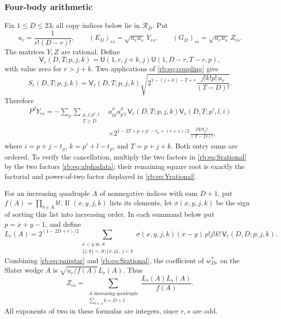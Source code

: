 \subsubsection{Four-body arithmetic}
\label{rb:app:four-arithmetic}
Fix $1\le D\le23$; all copy indices below lie in $\mathcal R_D$. Put
\[
 u_r=\frac1{r!(D-r)!},\qquad
 (E_D)_{rs}=\sqrt{u_ru_s}\,Y_{rs},\qquad
 (G_D)_{rs}=\sqrt{u_ru_s}\,Z_{rs}.
\]
The matrices $Y,Z$ are rational. Define
\[
 \mathsf V_r(D,T;p,j,k)=
 \mathsf U(1,r,j+k,j)\mathsf U(1,D-r,T-r,p),
\]
with value zero for $r>j+k$. Two applications of \eqref{rb:eq:coupling} give
\begin{equation}\label{rb:eq:Srational}
 S_r(D,T;p,j,k)=\mathsf V_r(D,T;p,j,k)
 \sqrt{2^{1-(j+k)-T+r}\frac{j!k!p!\,u_r}{(T-D)!}}.
\end{equation}
Therefore
\begin{equation}\label{rb:eq:Yrational}
 \begin{split}
 P^2Y_{rs}=-\sum_\rho\sum_{\substack{p,j;p',l\\T\ge D}}
 &a^\rho_{pj}a^\rho_{p'l}\,
 \mathsf V_r(D,T;p,j,k)\mathsf V_s(D,T;p',l,i)\\
 &\times2^{1-2T+p+p'-t_\rho+(r+s)/2}
       \frac{i!k!t_\rho!}{(T-D)!},
 \end{split}
\end{equation}
where $i=p+j-t_\rho$, $k=p'+l-t_\rho$, and $T=p+j+k$. Both entry sums are ordered. To verify the cancellation, multiply the two factors in \eqref{rb:eq:Srational} by the two factors \eqref{rb:eq:alphadata}; their remaining square root is exactly the factorial and power-of-two factor displayed in \eqref{rb:eq:Yrational}.

For an increasing quadruple $A$ of nonnegative indices with sum $D+1$, put $f(A)=\prod_{b\in A}b!$. If $(x,y,j,k)$ lists its elements, let $\sigma(x,y,j,k)$ be the sign of sorting this list into increasing order. In each summand below put $p=x+y-1$, and define
\begin{equation}\label{rb:eq:Lrational}
 L_r(A)=2^{(1-2D+r)/2}
 \sum_{\substack{x<y\text{ in }A\\\{j,k\}=A\setminus\{x,y\},\ j<k}}
 \sigma(x,y,j,k)(x-y)\,p!j!k!\,
 \mathsf V_r(D,D;p,j,k).
\end{equation}
Combining \eqref{rb:eq:pairstar} and \eqref{rb:eq:Srational}, the coefficient of $w_{Dr}^*$ on the Slater wedge $A$ is $\sqrt{u_r/f(A)}L_r(A)$. Thus
\begin{equation}\label{rb:eq:Zrational}
 Z_{rs}=\sum_{\substack{A\text{ increasing quadruple}\\\sum_{b\in A}b=D+1}}
                   \frac{L_r(A)L_s(A)}{f(A)}.
\end{equation}
All exponents of two in these formulas are integers, since $r,s$ are odd.


